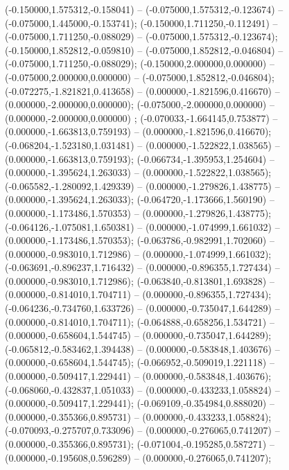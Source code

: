  (-0.150000,1.575312,-0.158041) -- (-0.075000,1.575312,-0.123674) -- (-0.075000,1.445000,-0.153741);
 (-0.150000,1.711250,-0.112491) -- (-0.075000,1.711250,-0.088029) -- (-0.075000,1.575312,-0.123674);
 (-0.150000,1.852812,-0.059810) -- (-0.075000,1.852812,-0.046804) -- (-0.075000,1.711250,-0.088029);
 (-0.150000,2.000000,0.000000) -- (-0.075000,2.000000,0.000000) -- (-0.075000,1.852812,-0.046804);
 (-0.072275,-1.821821,0.413658) -- (0.000000,-1.821596,0.416670) -- (0.000000,-2.000000,0.000000);
 (-0.075000,-2.000000,0.000000) -- (0.000000,-2.000000,0.000000) ;
 (-0.070033,-1.664145,0.753877) -- (0.000000,-1.663813,0.759193) -- (0.000000,-1.821596,0.416670);
 (-0.068204,-1.523180,1.031481) -- (0.000000,-1.522822,1.038565) -- (0.000000,-1.663813,0.759193);
 (-0.066734,-1.395953,1.254604) -- (0.000000,-1.395624,1.263033) -- (0.000000,-1.522822,1.038565);
 (-0.065582,-1.280092,1.429339) -- (0.000000,-1.279826,1.438775) -- (0.000000,-1.395624,1.263033);
 (-0.064720,-1.173666,1.560190) -- (0.000000,-1.173486,1.570353) -- (0.000000,-1.279826,1.438775);
 (-0.064126,-1.075081,1.650381) -- (0.000000,-1.074999,1.661032) -- (0.000000,-1.173486,1.570353);
 (-0.063786,-0.982991,1.702060) -- (0.000000,-0.983010,1.712986) -- (0.000000,-1.074999,1.661032);
 (-0.063691,-0.896237,1.716432) -- (0.000000,-0.896355,1.727434) -- (0.000000,-0.983010,1.712986);
 (-0.063840,-0.813801,1.693828) -- (0.000000,-0.814010,1.704711) -- (0.000000,-0.896355,1.727434);
 (-0.064236,-0.734760,1.633726) -- (0.000000,-0.735047,1.644289) -- (0.000000,-0.814010,1.704711);
 (-0.064888,-0.658256,1.534721) -- (0.000000,-0.658604,1.544745) -- (0.000000,-0.735047,1.644289);
 (-0.065812,-0.583462,1.394438) -- (0.000000,-0.583848,1.403676) -- (0.000000,-0.658604,1.544745);
 (-0.066952,-0.509019,1.221118) -- (0.000000,-0.509417,1.229441) -- (0.000000,-0.583848,1.403676);
 (-0.068060,-0.432837,1.051033) -- (0.000000,-0.433233,1.058824) -- (0.000000,-0.509417,1.229441);
 (-0.069109,-0.354984,0.888020) -- (0.000000,-0.355366,0.895731) -- (0.000000,-0.433233,1.058824);
 (-0.070093,-0.275707,0.733096) -- (0.000000,-0.276065,0.741207) -- (0.000000,-0.355366,0.895731);
 (-0.071004,-0.195285,0.587271) -- (0.000000,-0.195608,0.596289) -- (0.000000,-0.276065,0.741207);
